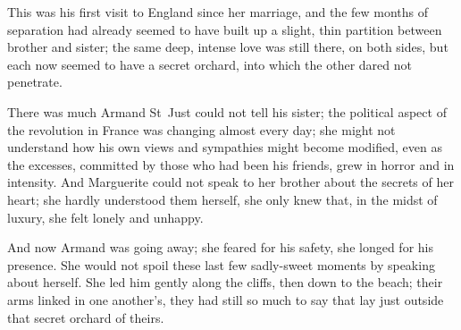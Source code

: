 This was his first visit to England since her marriage, and the few months of separation had already seemed to have built up a slight, thin partition between brother and sister; the same deep, intense love was still there, on both sides, but each now seemed to have a secret orchard, into which the other dared not penetrate.

There was much Armand St~Just could not tell his sister; the political aspect of the revolution in France was changing almost every day; she might not understand how his own views and sympathies might become modified, even as the excesses, committed by those who had been his friends, grew in horror and in intensity. And Marguerite could not speak to her brother about the secrets of her heart; she hardly understood them herself, she only knew that, in the midst of luxury, she felt lonely and unhappy.

And now Armand was going away; she feared for his safety, she longed for his presence. She would not spoil these last few sadly-sweet moments by speaking about herself. She led him gently along the cliffs, then down to the beach; their arms linked in one another's, they had still so much to say that lay just outside that secret orchard of theirs.
